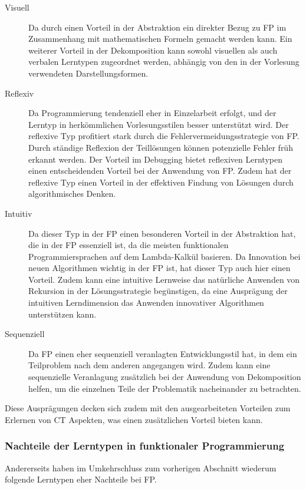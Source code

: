 \begin{description}
    \item[Visuell] Da durch einen Vorteil in der Abstraktion ein direkter Bezug zu FP im Zusammenhang mit mathematischen Formeln gemacht werden kann. Ein weiterer Vorteil in der Dekomposition kann sowohl visuellen als auch verbalen Lerntypen zugeordnet werden, abhängig von den in der Vorlesung verwendeten Darstellungsformen.
    \item[Reflexiv] Da Programmierung tendenziell eher in Einzelarbeit erfolgt, und der Lerntyp in herkömmlichen Vorlesungsstilen besser unterstützt wird. Der reflexive Typ profitiert stark durch die Fehlervermeidungsstrategie von FP. Durch ständige Reflexion der Teillösungen können potenzielle Fehler früh erkannt werden. Der Vorteil im Debugging bietet reflexiven Lerntypen einen entscheidenden Vorteil bei der Anwendung von FP. Zudem hat der reflexive Typ einen Vorteil in der effektiven Findung von Lösungen durch algorithmisches Denken.
    \item[Intuitiv] Da dieser Typ in der FP einen besonderen Vorteil in der Abstraktion hat, die in der FP essenziell ist, da die meisten funktionalen Programmiersprachen auf dem Lambda-Kalkül basieren. Da Innovation bei neuen Algorithmen wichtig in der FP ist, hat dieser Typ auch hier einen Vorteil. Zudem kann eine intuitive Lernweise das natürliche Anwenden von Rekursion in der Lösungsstrategie begünstigen, da eine Ausprägung der intuitiven Lerndimension das Anwenden innovativer Algorithmen unterstützen kann.
    \item[Sequenziell] Da FP einen eher sequenziell veranlagten Entwicklungsstil hat, in dem ein Teilproblem nach dem anderen angegangen wird. Zudem kann eine sequenzielle Veranlagung zusätzlich bei der Anwendung von Dekomposition helfen, um die einzelnen Teile der Problematik nacheinander zu betrachten.
\end{description}

Diese Ausprägungen decken sich zudem mit den ausgearbeiteten Vorteilen zum Erlernen von CT Aspekten, was einen zusätzlichen Vorteil bieten kann.
\\
\subsubsection{Nachteile der Lerntypen in funktionaler Programmierung}

Andererseits haben im Umkehrschluss zum vorherigen Abschnitt wiederum folgende Lerntypen eher Nachteile bei FP.

